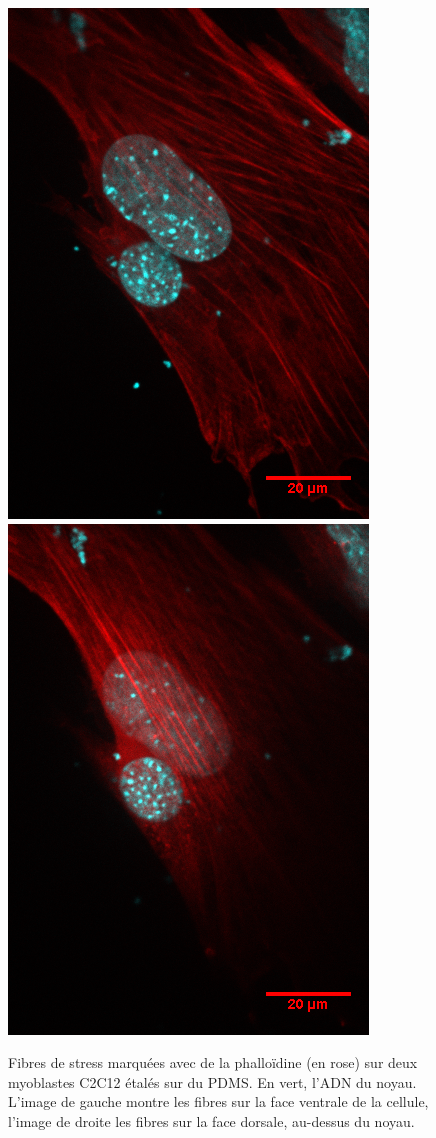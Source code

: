 \begin{figure}
\includegraphics[scale=0.4]{Figures/Fibres_de_stress_dessous.png} \includegraphics[scale=0.4]{Figures/Fibres_de_stress_dessus.png} 
\caption{Fibres de stress marquées avec de la phalloïdine (en rose) sur deux myoblastes C2C12 étalés sur du PDMS. En vert, l'ADN du noyau. L'image de gauche montre les fibres sur la face ventrale de la cellule, l'image de droite les fibres sur la face dorsale, au-dessus du noyau. }
\end{figure}
